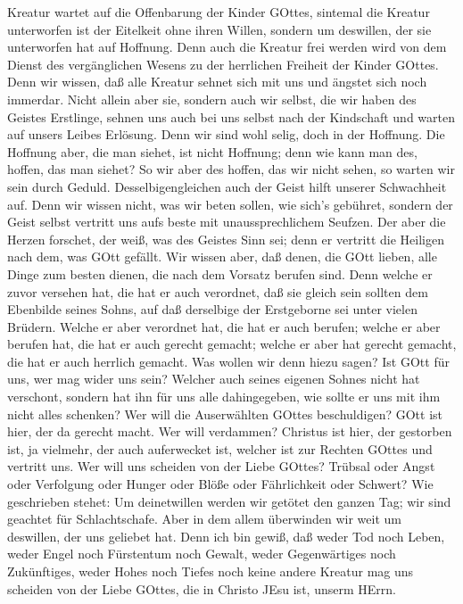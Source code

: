 Kreatur wartet auf die Offenbarung der Kinder GOttes, 
sintemal die Kreatur unterworfen ist der Eitelkeit ohne ihren Willen,
sondern um deswillen, der sie unterworfen hat auf Hoffnung.
 Denn auch die Kreatur frei werden wird von dem Dienst des
vergänglichen Wesens zu der herrlichen Freiheit der Kinder GOttes.
 Denn wir wissen, daß alle Kreatur sehnet sich mit uns und
ängstet sich noch immerdar.  Nicht allein aber sie, sondern
auch wir selbst, die wir haben des Geistes Erstlinge, sehnen uns auch
bei uns selbst nach der Kindschaft und warten auf unsers Leibes
Erlösung.  Denn wir sind wohl selig, doch in der Hoffnung.
Die Hoffnung aber, die man siehet, ist nicht Hoffnung; denn wie kann man
des, hoffen, das man siehet?  So wir aber des hoffen, das
wir nicht sehen, so warten wir sein durch Geduld. 
Desselbigengleichen auch der Geist hilft unserer Schwachheit auf. Denn
wir wissen nicht, was wir beten sollen, wie sich's gebühret, sondern der
Geist selbst vertritt uns aufs beste mit unaussprechlichem Seufzen.
 Der aber die Herzen forschet, der weiß, was des Geistes
Sinn sei; denn er vertritt die Heiligen nach dem, was GOtt gefällt.
 Wir wissen aber, daß denen, die GOtt lieben, alle Dinge
zum besten dienen, die nach dem Vorsatz berufen sind.  Denn
welche er zuvor versehen hat, die hat er auch verordnet, daß sie gleich
sein sollten dem Ebenbilde seines Sohns, auf daß derselbige der
Erstgeborne sei unter vielen Brüdern.  Welche er aber
verordnet hat, die hat er auch berufen; welche er aber berufen hat, die
hat er auch gerecht gemacht; welche er aber hat gerecht gemacht, die hat
er auch herrlich gemacht.  Was wollen wir denn hiezu sagen?
Ist GOtt für uns, wer mag wider uns sein?  Welcher auch
seines eigenen Sohnes nicht hat verschont, sondern hat ihn für uns alle
dahingegeben, wie sollte er uns mit ihm nicht alles schenken?
 Wer will die Auserwählten GOttes beschuldigen? GOtt ist
hier, der da gerecht macht.  Wer will verdammen? Christus
ist hier, der gestorben ist, ja vielmehr, der auch auferwecket ist,
welcher ist zur Rechten GOttes und vertritt uns.  Wer will
uns scheiden von der Liebe GOttes? Trübsal oder Angst oder Verfolgung
oder Hunger oder Blöße oder Fährlichkeit oder Schwert?  Wie
geschrieben stehet: Um deinetwillen werden wir getötet den ganzen Tag;
wir sind geachtet für Schlachtschafe.  Aber in dem allem
überwinden wir weit um deswillen, der uns geliebet hat. 
Denn ich bin gewiß, daß weder Tod noch Leben, weder Engel noch
Fürstentum noch Gewalt, weder Gegenwärtiges noch Zukünftiges,
 weder Hohes noch Tiefes noch keine andere Kreatur mag uns
scheiden von der Liebe GOttes, die in Christo JEsu ist, unserm HErrn.

